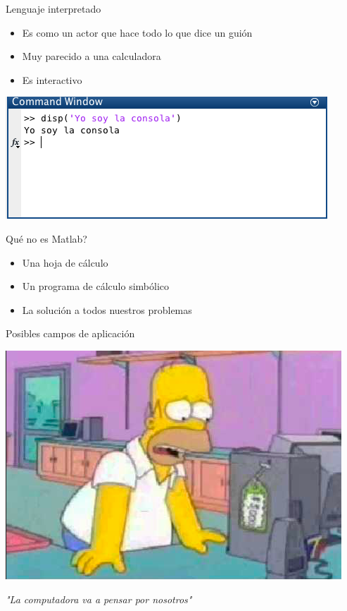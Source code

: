 \documentclass{bredelebeamer}
\begin{document}
\begin{frame}{Lenguaje interpretado}
\begin{itemize}
\item Es como un actor que hace todo lo que dice un guión
\item Muy parecido a una calculadora
\item Es interactivo
\end{itemize}
\begin{center}
\includegraphics[scale=0.5]{images/consola.png}
\end{center}
\end{frame}

\begin{frame}{Qué no es Matlab?}
\begin{itemize}
\item Una hoja de cálculo
\item Un programa de cálculo simbólico
\item La solución a todos nuestros problemas
\end{itemize}
\end{frame}

\begin{frame}{Posibles campos de aplicación}
\begin{center}
\includegraphics[scale=0.4]{images/img40.png}\\
\end{center}
\begin{center}
\textit{"La computadora va a pensar por nosotros"}
\end{center}
\end{frame}
\end{document}
